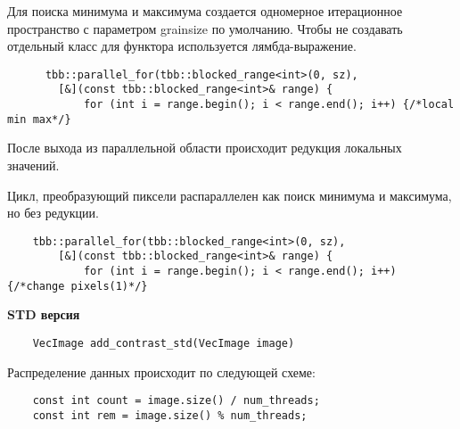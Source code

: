 \documentclass{report}
\begin{document}
    \par Для поиска минимума и максимума создается одномерное итерационное пространство с параметром grainsize по умолчанию. Чтобы не создавать отдельный класс для функтора используется лямбда-выражение.
    \begin{lstlisting}
      tbb::parallel_for(tbb::blocked_range<int>(0, sz),
        [&](const tbb::blocked_range<int>& range) {
            for (int i = range.begin(); i < range.end(); i++) {/*local min max*/}
    \end{lstlisting}
    После выхода из параллельной области происходит редукция локальных значений.
    \par Цикл, преобразующий пиксели распараллелен как поиск минимума и максимума, но без редукции.
    \begin{lstlisting}
    tbb::parallel_for(tbb::blocked_range<int>(0, sz),
        [&](const tbb::blocked_range<int>& range) {
            for (int i = range.begin(); i < range.end(); i++) {/*change pixels(1)*/}
    \end{lstlisting}    

    \newpage
    \textbf{STD версия}
    \begin{lstlisting}
    VecImage add_contrast_std(VecImage image)
    \end{lstlisting}
    Распределение данных происходит по следующей схеме:
    \begin{lstlisting}
    const int count = image.size() / num_threads;
    const int rem = image.size() % num_threads;
    \end{lstlisting}
    
\end{document}
